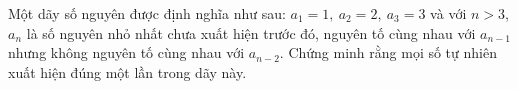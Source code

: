 \ifshowproblem
\begin{problem}\label{example:RUS-2015-SMO-10-P6}
    Một dãy số nguyên được định nghĩa như sau: \( a_1 = 1,\ a_2 = 2,\ a_3 = 3 \) và với \( n > 3 \),
    $a_n$ là số nguyên nhỏ nhất chưa xuất hiện trước đó, nguyên tố cùng nhau với $a_{n-1}$ nhưng không nguyên tố cùng nhau với $a_{n-2}$.
    Chứng minh rằng mọi số tự nhiên xuất hiện đúng một lần trong dãy này.
\end{problem}
\fi

\footnotemark
{}
\fi